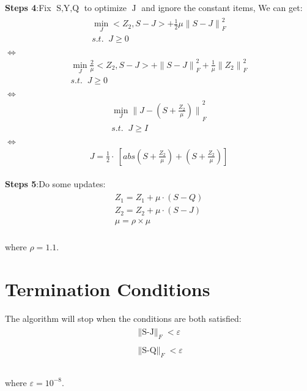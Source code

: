 \documentclass{article}
\begin{document}
\begin{flushleft}
\textbf{Steps 4}:\;\;Fix $\mathop{S,Y,Q}$ to optimize $\mathop{J}$ and ignore the constant items, We can get:
\begin{eqnarray}
\begin{array}{l}
    \mathop{\min}\limits_{J} <Z_2,S-J> + \frac{1}{2}\mu {\parallel S - J \parallel}_F^2  \\
    s.t. \;\; J \geq 0\\
\end{array}
\end{eqnarray}
$\Longleftrightarrow$
\begin{eqnarray}
\begin{array}{l}
    \mathop{\min}\limits_{J} \frac{2}{\mu} <Z_2,S-J> + {\parallel S - J \parallel}_F^2  + \frac{1}{\mu}{\parallel Z_2\parallel}_F^2\\
    s.t. \;\; J \geq 0\\
\end{array}
\end{eqnarray}
$\Longleftrightarrow$
\begin{eqnarray}
\begin{array}{l}
    \mathop{\min}\limits_{J} {\parallel J-(S+ \frac{Z_2}{\mu} )\parallel}_F^2\\
    s.t. \;\; J \geq I\\
\end{array}
\end{eqnarray}
$\Longleftrightarrow$
\begin{eqnarray}
\begin{array}{l}
    J=\frac{1}{2}\cdot\ [abs(S+ \frac{Z_2}{\mu})+ (S+ \frac{Z_2}{\mu})]
\end{array}
\end{eqnarray}
\end{flushleft}

\begin{flushleft}
\textbf{Steps 5}:\;\;Do some updates:
\begin{eqnarray}
\begin{array}{l}
Z_1 = Z_1 + \mu \cdot (S-Q)\\
Z_2 = Z_2 + \mu \cdot (S-J)\\
\mu = \rho \times \mu
\end{array}
\end{eqnarray}\\
where $\rho = 1.1 $.
\end{flushleft}

\section{Termination Conditions}
The algorithm will stop when the conditions are both satisfied:
\begin{eqnarray}
\begin{array}{l}
\mathop{\parallel S-J \parallel}_F < \varepsilon \\\\
\mathop{\parallel S-Q \parallel}_F < \varepsilon \\
\end{array}
\end{eqnarray}\\
where $\varepsilon = 10^{-8}$.\\
\end{document}
